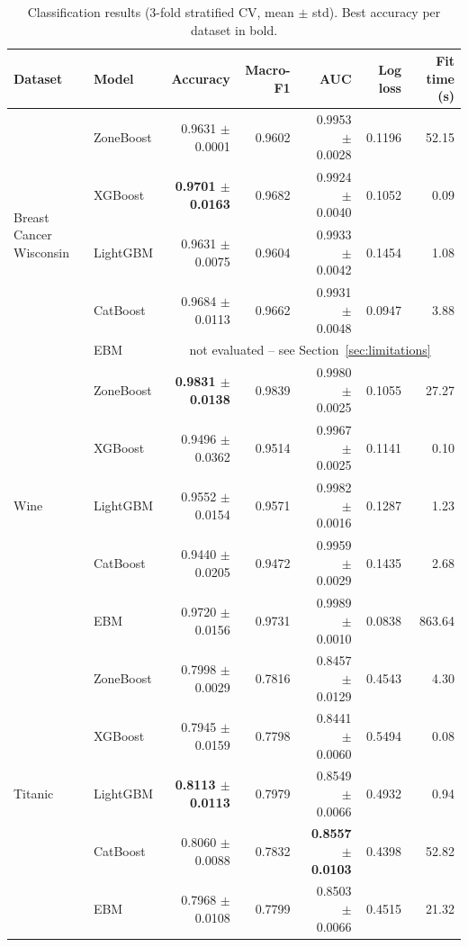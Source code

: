 \documentclass[11pt]{article}
\begin{document}
\begin{table}[t]
\centering
\caption{Classification results (3-fold stratified CV, mean $\pm$ std).
Best accuracy per dataset in bold.}
\label{tab:classification}
\begin{tabular}{llrrrrr}
\toprule
Dataset & Model & Accuracy & Macro-F1 & AUC & Log loss & Fit time (s) \\
\midrule
\multirow{5}{*}{Breast Cancer Wisconsin}
 & ZoneBoost & 0.9631 $\pm$ 0.0001 & 0.9602 & 0.9953 $\pm$ 0.0028 & 0.1196 & 52.15 \\
 & XGBoost   & \textbf{0.9701 $\pm$ 0.0163} & 0.9682 & 0.9924 $\pm$ 0.0040 & 0.1052 & 0.09 \\
 & LightGBM  & 0.9631 $\pm$ 0.0075 & 0.9604 & 0.9933 $\pm$ 0.0042 & 0.1454 & 1.08 \\
 & CatBoost  & 0.9684 $\pm$ 0.0113 & 0.9662 & 0.9931 $\pm$ 0.0048 & 0.0947 & 3.88 \\
 & EBM       & \multicolumn{5}{c}{not evaluated -- see Section~\ref{sec:limitations}} \\
\midrule
\multirow{5}{*}{Wine}
 & ZoneBoost & \textbf{0.9831 $\pm$ 0.0138} & 0.9839 & 0.9980 $\pm$ 0.0025 & 0.1055 & 27.27 \\
 & XGBoost   & 0.9496 $\pm$ 0.0362 & 0.9514 & 0.9967 $\pm$ 0.0025 & 0.1141 & 0.10 \\
 & LightGBM  & 0.9552 $\pm$ 0.0154 & 0.9571 & 0.9982 $\pm$ 0.0016 & 0.1287 & 1.23 \\
 & CatBoost  & 0.9440 $\pm$ 0.0205 & 0.9472 & 0.9959 $\pm$ 0.0029 & 0.1435 & 2.68 \\
 & EBM       & 0.9720 $\pm$ 0.0156 & 0.9731 & 0.9989 $\pm$ 0.0010 & 0.0838 & 863.64 \\
\midrule
\multirow{5}{*}{Titanic}
 & ZoneBoost & 0.7998 $\pm$ 0.0029 & 0.7816 & 0.8457 $\pm$ 0.0129 & 0.4543 & 4.30 \\
 & XGBoost   & 0.7945 $\pm$ 0.0159 & 0.7798 & 0.8441 $\pm$ 0.0060 & 0.5494 & 0.08 \\
 & LightGBM  & \textbf{0.8113 $\pm$ 0.0113} & 0.7979 & 0.8549 $\pm$ 0.0066 & 0.4932 & 0.94 \\
 & CatBoost  & 0.8060 $\pm$ 0.0088 & 0.7832 & \textbf{0.8557 $\pm$ 0.0103} & 0.4398 & 52.82 \\
 & EBM       & 0.7968 $\pm$ 0.0108 & 0.7799 & 0.8503 $\pm$ 0.0066 & 0.4515 & 21.32 \\
\bottomrule
\end{tabular}
\end{table}
\end{document}
